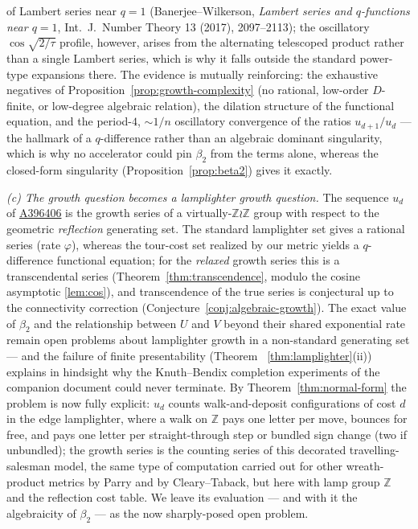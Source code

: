 \documentclass[11pt,a4paper]{article}
\theoremstyle{remark}
\theoremstyle{plain}
\begin{document}
of Lambert series near $q=1$ (Banerjee--Wilkerson, \emph{Lambert series and
$q$-functions near $q=1$}, Int.\ J.\ Number Theory 13 (2017), 2097--2113);
the oscillatory $\cos\sqrt{2/\tau}$ profile, however, arises from the
alternating telescoped product rather than a single Lambert series, which is
why it falls outside the standard power-type expansions there.  The evidence is mutually reinforcing: the exhaustive
negatives of Proposition~\ref{prop:growth-complexity} (no rational,
low-order $D$-finite, or low-degree algebraic relation), the dilation
structure of the functional equation, and the period-$4$, $\sim 1/n$
oscillatory convergence of the ratios $u_{d+1}/u_d$ --- the hallmark of a
$q$-difference rather than an algebraic dominant singularity, which is why
no accelerator could pin $\beta_2$ from the terms alone, whereas the
closed-form singularity (Proposition~\ref{prop:beta2}) gives it exactly.

\emph{(c) The growth question becomes a lamplighter growth question.}
The sequence $u_d$ of \href{https://oeis.org/A396406}{A396406} is the
growth series of a virtually-$\mathbb{Z}\wr\mathbb{Z}$ group with
respect to the geometric \emph{reflection} generating set.  The standard
lamplighter set gives a rational series (rate $\varphi$), whereas the
tour-cost set realized by our metric yields a $q$-difference functional
equation; for the \emph{relaxed} growth series this is a transcendental
series (Theorem~\ref{thm:transcendence}, modulo the cosine asymptotic
\eqref{lem:cos}), and transcendence of the true series is conjectural up
to the connectivity correction (Conjecture~\ref{conj:algebraic-growth}).
The exact value of $\beta_2$ and the relationship between $U$ and $V$
beyond their shared exponential rate remain open problems about
lamplighter growth in a non-standard generating set
--- and the failure of finite presentability (Theorem~
\ref{thm:lamplighter}(ii)) explains in hindsight why the Knuth--Bendix
completion experiments of the companion document could never terminate.
By Theorem~\ref{thm:normal-form} the problem is now fully explicit:
$u_d$ counts walk-and-deposit configurations of cost $d$ in the edge
lamplighter, where a walk on $\mathbb{Z}$ pays one letter per move,
bounces for free, and pays one letter per straight-through step or
bundled sign change (two if unbundled); the growth series is the
counting series of this decorated travelling-salesman model, the same
type of computation carried out for other wreath-product metrics by
Parry and by Cleary--Taback, but here with lamp group $\mathbb{Z}$ and
the reflection cost table.  We leave its evaluation --- and with it the
algebraicity of $\beta_2$ --- as the now sharply-posed open problem.
\end{document}

